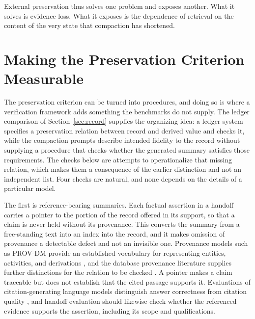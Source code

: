 \documentclass[11pt]{article}
\begin{document}
External preservation thus solves one problem and exposes another. What it solves is evidence loss. What it exposes is the dependence of retrieval on the content of the very state that compaction has shortened.

\section{Making the Preservation Criterion Measurable}

The preservation criterion can be turned into procedures, and doing so is where a verification framework adds something the benchmarks do not supply. The ledger comparison of Section~\ref{sec:record} supplies the organizing idea: a ledger system specifies a preservation relation between record and derived value and checks it, while the compaction prompts describe intended fidelity to the record without supplying a procedure that checks whether the generated summary satisfies those requirements. The checks below are attempts to operationalize that missing relation, which makes them a consequence of the earlier distinction and not an independent list. Four checks are natural, and none depends on the details of a particular model.

The first is reference-bearing summaries. Each factual assertion in a handoff carries a pointer to the portion of the record offered in its support, so that a claim is never held without its provenance. This converts the summary from a free-standing text into an index into the record, and it makes omission of provenance a detectable defect and not an invisible one. Provenance models such as PROV-DM provide an established vocabulary for representing entities, activities, and derivations \cite{moreau2013}, and the database provenance literature supplies further distinctions for the relation to be checked \cite{cheney}. A pointer makes a claim traceable but does not establish that the cited passage supports it. Evaluations of citation-generating language models distinguish answer correctness from citation quality \cite{gao2023}, and handoff evaluation should likewise check whether the referenced evidence supports the assertion, including its scope and qualifications.
\end{document}
